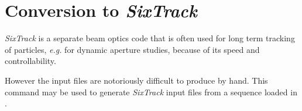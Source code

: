 

\chapter{Conversion to \textit{SixTrack}}
\label{chap:sixtrack}

\textit{SixTrack}\cite{SixTrack}\cite{SixTrack-www} is a separate beam 
optics code that is often used for long term tracking of particles, 
\textsl{e.g.} for dynamic aperture studies, because of its speed and
controllability.  

However the input files are notoriously difficult to produce by
hand. This command may be used to generate \textit{SixTrack} input files
from a sequence loaded in \madx. 


 
